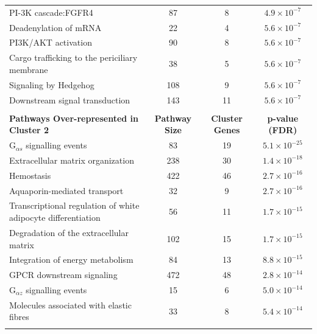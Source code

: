 \begin{table}[!hp]
{\begin{tabular}{lccc}
  \rowcolor{Cluster_Blue!20} 
  PI-3K cascade:FGFR4 &  87 &   8 & $4.9 \times 10^{-7}$ \\ 
  \rowcolor{Cluster_Blue!15} 
  Deadenylation of mRNA &  22 &   4 & $5.6 \times 10^{-7}$ \\ 
  \rowcolor{Cluster_Blue!20} 
  PI3K/AKT activation &  90 &   8 & $5.6 \times 10^{-7}$ \\ 
  \rowcolor{Cluster_Blue!15} 
  Cargo trafficking to the periciliary membrane &  38 &   5 & $5.6 \times 10^{-7}$ \\ 
  \rowcolor{Cluster_Blue!20} 
  Signaling by Hedgehog & 108 &   9 & $5.6 \times 10^{-7}$ \\ 
  \rowcolor{Cluster_Blue!15} 
  Downstream signal transduction & 143 &  11 & $5.6 \times 10^{-7}$ \\ 
  \hline
  \\
  \cellcolor{white} \large{\textbf{Pathways Over-represented in Cluster 2}} & \large{\textbf{Pathway Size}} & \large{\textbf{Cluster Genes}} & \large{\textbf{p-value (FDR)}} \\ %
  \hline
  \rowcolor{Cluster_Green!20}
  G$_{\alpha s}$ signalling events &  83 &  19 & $5.1 \times 10^{-25}$ \\ 
  \rowcolor{Cluster_Green!15}
  Extracellular matrix organization & 238 &  30 & $1.4 \times 10^{-18}$ \\ 
  \rowcolor{Cluster_Green!20} 
  Hemostasis & 422 &  46 & $2.7 \times 10^{-16}$ \\ 
  \rowcolor{Cluster_Green!15} 
  Aquaporin-mediated transport &  32 &   9 & $2.7 \times 10^{-16}$ \\ 
  \rowcolor{Cluster_Green!20} 
  Transcriptional regulation of white adipocyte differentiation &  56 &  11 & $1.7 \times 10^{-15}$ \\ 
  \rowcolor{Cluster_Green!15} 
  Degradation of the extracellular matrix & 102 &  15 & $1.7 \times 10^{-15}$ \\ 
  \rowcolor{Cluster_Green!20} 
  Integration of energy metabolism &  84 &  13 & $8.8 \times 10^{-15}$ \\ 
  \rowcolor{Cluster_Green!15} 
  GPCR downstream signaling & 472 &  48 & $2.8 \times 10^{-14}$ \\ 
  \rowcolor{Cluster_Green!20} 
  G$_{\alpha z}$ signalling events &  15 &   6 & $5.0 \times 10^{-14}$ \\ 
  \rowcolor{Cluster_Green!15} 
  Molecules associated with elastic fibres &  33 &   8 & $5.4 \times 10^{-14}$ \\ 
  \rowcolor{Cluster_Green!20} 

\end{tabular}}
\end{table}
